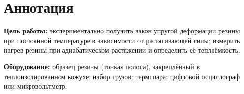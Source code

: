 \section{Аннотация}
\textbf{Цель работы:} экспериментально получить закон упругой деформации резины при
постоянной температуре в зависимости от растягивающей силы; измерить нагрев резины
при адиабатическом растяжении и определить её теплоёмкость.

\textbf{Оборудование:} образец резины (тонкая полоса), закреплённый в
теплоизолированном кожухе; набор грузов; термопара; цифровой осциллограф или
микровольтметр.